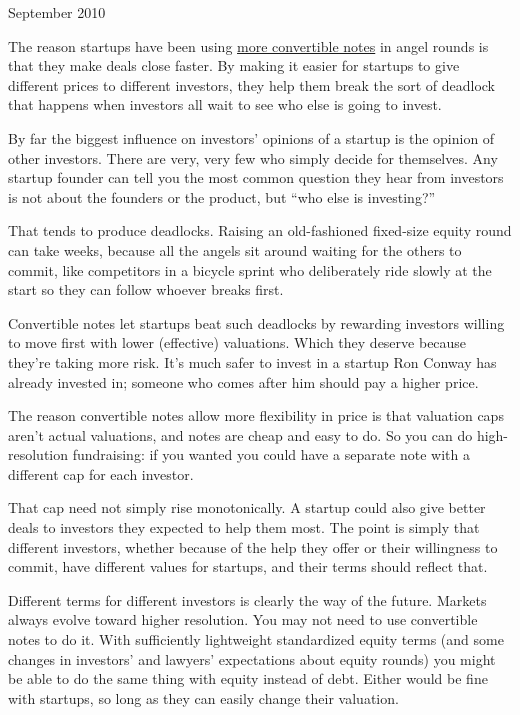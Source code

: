 September 2010

The reason startups have been using
\href{http://twitter.com/paulg/status/22319113993}{more convertible
notes} in angel rounds is that they make deals close faster. By making
it easier for startups to give different prices to different investors,
they help them break the sort of deadlock that happens when investors
all wait to see who else is going to invest.

By far the biggest influence on investors' opinions of a startup is the
opinion of other investors. There are very, very few who simply decide
for themselves. Any startup founder can tell you the most common
question they hear from investors is not about the founders or the
product, but ``who else is investing?''

That tends to produce deadlocks. Raising an old-fashioned fixed-size
equity round can take weeks, because all the angels sit around waiting
for the others to commit, like competitors in a bicycle sprint who
deliberately ride slowly at the start so they can follow whoever breaks
first.

Convertible notes let startups beat such deadlocks by rewarding
investors willing to move first with lower (effective) valuations. Which
they deserve because they're taking more risk. It's much safer to invest
in a startup Ron Conway has already invested in; someone who comes after
him should pay a higher price.

The reason convertible notes allow more flexibility in price is that
valuation caps aren't actual valuations, and notes are cheap and easy to
do. So you can do high-resolution fundraising: if you wanted you could
have a separate note with a different cap for each investor.

That cap need not simply rise monotonically. A startup could also give
better deals to investors they expected to help them most. The point is
simply that different investors, whether because of the help they offer
or their willingness to commit, have different values for startups, and
their terms should reflect that.

Different terms for different investors is clearly the way of the
future. Markets always evolve toward higher resolution. You may not need
to use convertible notes to do it. With sufficiently lightweight
standardized equity terms (and some changes in investors' and lawyers'
expectations about equity rounds) you might be able to do the same thing
with equity instead of debt. Either would be fine with startups, so long
as they can easily change their valuation.

